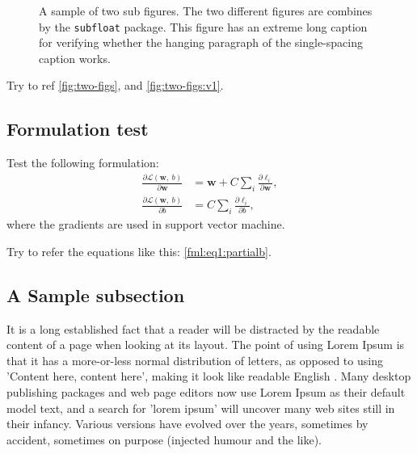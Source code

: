 \begin{figure}[ht]
  \centering
  \caption{A sample of two sub figures. The two different figures are combines by the \texttt{subfloat} package. This figure has an extreme long caption for verifying whether the hanging paragraph of the single-spacing caption works. \label{fig:two-figs}}
\end{figure}

Try to ref \autoref{fig:two-figs}, and \autoref{fig:two-figs:v1}.

\subsection{Formulation test}
Test the following formulation:
\begin{subequations}
  \renewcommand{\theequation}
  {\theparentequation-\arabic{equation}}
  \begin{align}
    \frac{\partial \mathcal{L}(\mathbf{w},~b)}{\partial \mathbf{w}} &= \mathbf{w} + C \sum\limits_i\frac{\partial \ell_i}{\partial \mathbf{w}}, \label{fml:eq1:partialW}\\
    \frac{\partial \mathcal{L}(\mathbf{w},~b)}{\partial b} &= C \sum\limits_i\frac{\partial \ell_i}{\partial b}, \label{fml:eq1:partialb}
  \end{align}
\end{subequations}
where the gradients are used in support vector machine.

Try to refer the equations like this: \eqref{fml:eq1:partialb}.

\subsection{A Sample subsection}
It is a long established fact that a reader will be distracted by the readable content of a page when looking at its layout. The point of using Lorem Ipsum is that it has a more-or-less normal distribution of letters, as opposed to using 'Content here, content here', making it look like readable English \cite{gass}. Many desktop publishing packages and web page editors now use Lorem Ipsum as their default model text, and a search for 'lorem ipsum' will uncover many web sites still in their infancy. Various versions have evolved over the years, sometimes by accident, sometimes on purpose (injected humour and the like).

